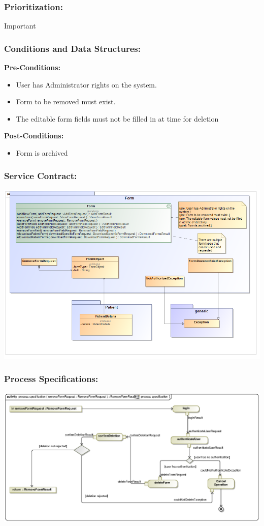 \subsubsection{Prioritization:}
Important
\subsubsection{Conditions and Data Structures:}
\textbf{Pre-Conditions:}
\begin{itemize}
	\item User has Administrator rights on the system.
	\item Form to be removed must exist.
	\item The editable form fields must not be filled in at time for deletion
\end{itemize}

\textbf{Post-Conditions:}	
\begin{itemize}
	\item Form is archived
\end{itemize}
\subsubsection{Service Contract:} 
\includegraphics[width=1\linewidth]{./Graphics/FormUseCaseDiagrams/removeForm_ServiceContract}
\subsubsection{Process Specifications:} 
\includegraphics[width=1\linewidth]{./Graphics/FormUseCaseDiagrams/processspecification_RemoveForm}

